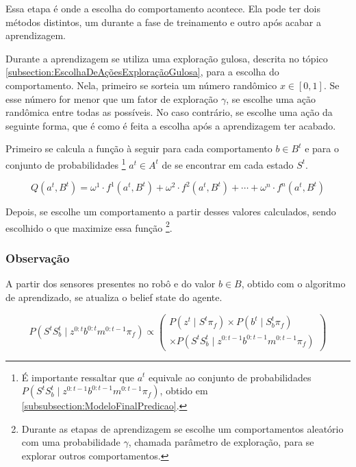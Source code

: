 Essa etapa é onde a escolha do comportamento acontece. Ela pode ter dois métodos distintos, um durante a fase de treinamento e outro após acabar a aprendizagem.

Durante a aprendizagem se utiliza uma exploração gulosa, descrita no tópico \ref{subsection:EscolhaDeAçõesExploraçãoGulosa}, para a escolha do comportamento. Nela, primeiro se sorteia um número randômico $ x \in [0,1] $. Se esse número for menor que um fator de exploração $ \gamma $, se escolhe uma ação randômica entre todas as possíveis. No caso contrário, se escolhe uma ação da seguinte forma, que é como é feita a escolha após a aprendizagem ter acabado.

Primeiro se calcula a função à seguir para cada comportamento $ b \in B^t $ e para o conjunto de probabilidades%
\footnote{É importante ressaltar que $ a^t $ equivale ao conjunto de probabilidades $ P \left( S^t S_b^t \mid z^{0: t-1} b^{0: t-1} m^{0: t-1} \pi_f \right) $, obtido em \ref{subsubsection:ModeloFinalPredicao}.%
} $ a^t \in A^t $ de se encontrar em cada estado $ S^t $.

\begin{equation} \label{equation:QLearningEscolhaComportamentoFinal}
    	Q \left( a^t, B^t \right) = \omega^1 \cdot f^1 \left( a^t, B^t \right) + \omega^2 \cdot f^2 \left( a^t, B^t \right) + \cdots + \omega^n \cdot f^n \left( a^t, B^t \right)
\end{equation}

Depois, se escolhe um comportamento a partir desses valores calculados, sendo escolhido o que maximize essa função%
\footnote{Durante as etapas de aprendizagem se escolhe um comportamentos aleatório com uma probabilidade $ \gamma $, chamada parâmetro de exploração, para se explorar outros comportamentos.}.


\subsubsection{Observação}

A partir dos sensores presentes no robô e do valor $ b \in B $, obtido com o algoritmo de aprendizado, se atualiza o belief state do agente.

\begin{equation}
    P \left( S^t S_b^t \mid z^{0: t} b^{0: t} m^{0: t-1} \pi_f \right) \propto
        \left(
            \begin{array}{l}
                P \left( z^t \mid S^t \pi_f \right) \times P \left( b^t \mid S_b^t \pi_f \right) \\
                \times P \left( S^t S_b^t \mid z^{0: t-1} b^{0: t-1} m^{0: t-1} \pi_f \right)
            \end{array}
        \right)
\end{equation}


